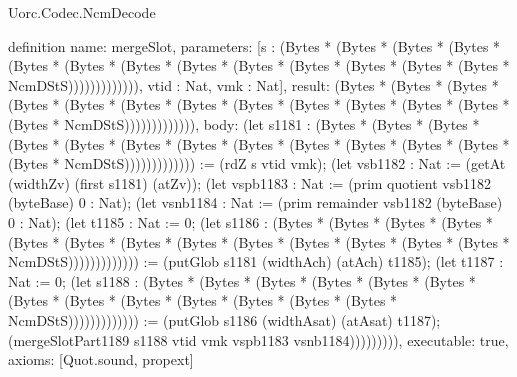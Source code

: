 \begin{lexlean}{Uorc.Codec.NcmDecode}
\begin{semanticmodule}
definition{
  name: mergeSlot,
  parameters: [s : (Bytes * (Bytes * (Bytes * (Bytes * (Bytes * (Bytes * (Bytes * (Bytes * (Bytes * (Bytes * (Bytes * (Bytes * (Bytes * NcmDStS))))))))))))), vtid : Nat, vmk : Nat],
  result: (Bytes * (Bytes * (Bytes * (Bytes * (Bytes * (Bytes * (Bytes * (Bytes * (Bytes * (Bytes * (Bytes * (Bytes * (Bytes * NcmDStS))))))))))))),
  body: (let s1181 : (Bytes * (Bytes * (Bytes * (Bytes * (Bytes * (Bytes * (Bytes * (Bytes * (Bytes * (Bytes * (Bytes * (Bytes * (Bytes * NcmDStS))))))))))))) := (rdZ s vtid vmk); (let vsb1182 : Nat := (getAt (widthZv) (first s1181) (atZv)); (let vspb1183 : Nat := (prim quotient vsb1182 (byteBase) 0 : Nat); (let vsnb1184 : Nat := (prim remainder vsb1182 (byteBase) 0 : Nat); (let t1185 : Nat := 0; (let s1186 : (Bytes * (Bytes * (Bytes * (Bytes * (Bytes * (Bytes * (Bytes * (Bytes * (Bytes * (Bytes * (Bytes * (Bytes * (Bytes * NcmDStS))))))))))))) := (putGlob s1181 (widthAch) (atAch) t1185); (let t1187 : Nat := 0; (let s1188 : (Bytes * (Bytes * (Bytes * (Bytes * (Bytes * (Bytes * (Bytes * (Bytes * (Bytes * (Bytes * (Bytes * (Bytes * (Bytes * NcmDStS))))))))))))) := (putGlob s1186 (widthAsat) (atAsat) t1187); (mergeSlotPart1189 s1188 vtid vmk vspb1183 vsnb1184))))))))),
  executable: true,
  axioms: [Quot.sound, propext]
}


\end{semanticmodule}
\end{lexlean}
